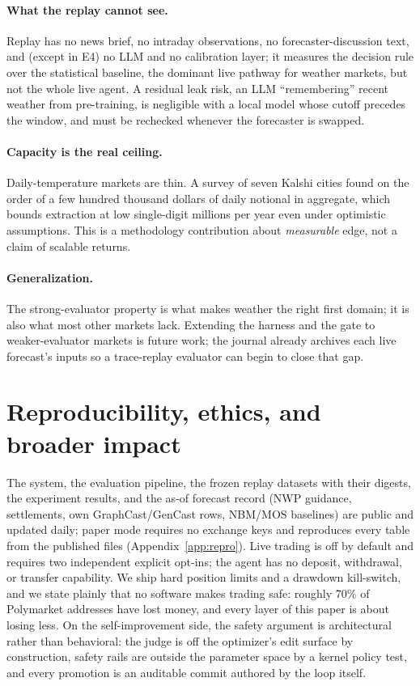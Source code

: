 \documentclass[sigconf,review,anonymous]{acmart}
\begin{document}
\paragraph{What the replay cannot see.} Replay has no news brief, no intraday
observations, no forecaster-discussion text, and (except in E4) no LLM and no
calibration layer; it measures the decision rule over the statistical baseline,
the dominant live pathway for weather markets, but not the whole live agent. A
residual leak risk, an LLM ``remembering'' recent weather from pre-training, is
negligible with a local model whose cutoff precedes the window, and must be
rechecked whenever the forecaster is swapped.

\paragraph{Capacity is the real ceiling.} Daily-temperature markets are thin. A
survey of seven Kalshi cities found on the order of a few hundred thousand
dollars of daily notional in aggregate, which bounds extraction at low
single-digit millions per year even under optimistic assumptions. This is a
methodology contribution about \emph{measurable} edge, not a claim of scalable
returns.

\paragraph{Generalization.} The strong-evaluator property is what makes weather
the right first domain; it is also what most other markets lack. Extending the
harness and the gate to weaker-evaluator markets is future work; the journal
already archives each live forecast's inputs so a trace-replay evaluator can
begin to close that gap.

\section{Reproducibility, ethics, and broader impact}

The system, the evaluation pipeline, the frozen replay datasets with their
digests, the experiment results, and the as-of forecast record (NWP guidance,
settlements, own GraphCast/GenCast rows, NBM/MOS baselines) are public and
updated daily; paper mode requires no exchange keys and reproduces every table
from the published files (Appendix~\ref{app:repro}). Live trading is off by
default and requires two independent explicit opt-ins; the agent has no
deposit, withdrawal, or transfer capability. We ship hard position limits and a
drawdown kill-switch, and we state plainly that no software makes trading safe:
roughly 70\% of Polymarket addresses have lost money, and every layer of this
paper is about losing less. On the self-improvement side, the safety argument
is architectural rather than behavioral: the judge is off the optimizer's edit
surface by construction, safety rails are outside the parameter space by a
kernel policy test, and every promotion is an auditable commit authored by the
loop itself.
\end{document}

